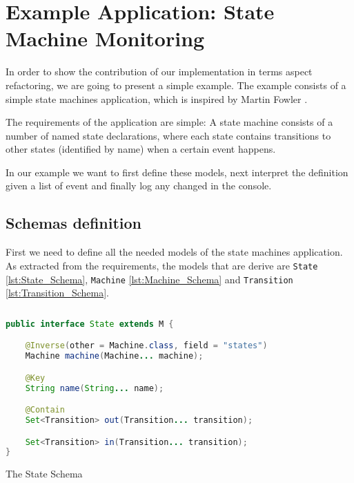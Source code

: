 
\chapter{Example Application: State Machine Monitoring}\label{Example Application}
In order to show the contribution of our implementation in terms aspect refactoring, we are going to present a simple example.
The example consists of a simple state machines application, which is inspired by Martin Fowler \cite{fowler2010domain}.

The requirements of the application are simple: A state machine consists of a number of named state declarations, where each state contains transitions to other states (identified by name) when a certain event happens.

In our example we want to first define these models, next interpret the definition given a list of event and finally log any changed in the console.

\section{Schemas definition}
First we need to define all the needed models of the state machines application. As extracted from the requirements, the models that are derive are \texttt{State} \ref{lst:State_Schema}, \texttt{Machine} \ref{lst:Machine_Schema} and \texttt{Transition} \ref{lst:Transition_Schema}.

\begin{sourcecode}
	\begin{lstlisting}[language=Java]
public interface State extends M {

    @Inverse(other = Machine.class, field = "states")
    Machine machine(Machine... machine);

    @Key
    String name(String... name);

    @Contain
    Set<Transition> out(Transition... transition);

    Set<Transition> in(Transition... transition);
}
	\end{lstlisting}
	\caption{The State Schema}
	\label{lst:State_Schema}
\end{sourcecode}

